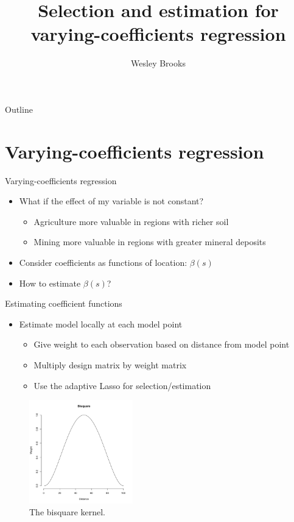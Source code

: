 \documentclass{beamer}
\author{Wesley Brooks}
\title[Varying-coefficients selection]{Selection and estimation for varying-coefficients regression}
\institute{UW-Madison}
\begin{document}
\begin{frame}
\titlepage
\end{frame}


\begin{frame}{Outline}
  \tableofcontents
\end{frame}




\section{Varying-coefficients regression}

\begin{frame}{Varying-coefficients regression}
\begin{itemize}
	\item What if the effect of my variable is not constant?
	\begin{itemize}
		\item Agriculture more valuable in regions with richer soil
		\item Mining more valuable in regions with greater mineral deposits
	\end{itemize}
	\item Consider coefficients as functions of location: $\beta(s)$
	\item How to estimate $\beta(s)$?
\end{itemize}
\end{frame}


\begin{frame}{Estimating coefficient functions}
\begin{itemize}
	\item Estimate model locally at each model point
	\begin{itemize}
		\item Give weight to each observation based on distance from model point
		\item Multiply design matrix by weight matrix
		\item Use the adaptive Lasso for selection/estimation
	\end{itemize}
\end{itemize}

\begin{figure}
\begin{center}
	\includegraphics[width=0.4\textwidth]{../../figures/simulation/illustrations/bisquare}
	\caption{The bisquare kernel.}
\end{center}
\end{figure}

\end{frame}
\end{document}
